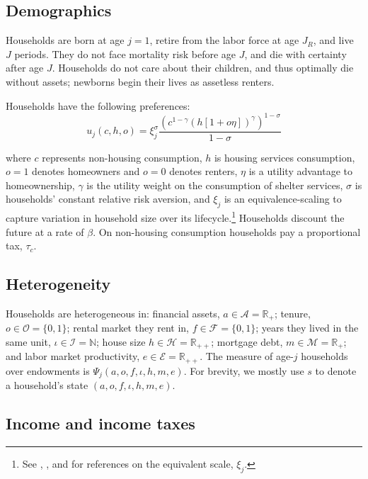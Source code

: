 \documentclass[parskip=full]{article}
\begin{document}
\subsection{Demographics}\label{subsection:demographics}

Households are born at age $j=1$, retire from the labor force at age $J_{R}$, and live $J$ periods. They do not face mortality risk before age $J$, and die with certainty after age $J$. Households do not care about their children, and thus optimally die without assets; newborns begin their lives as assetless renters.

Households have the following preferences:
\begin{equation*}
    u_{j}(c,h,o)=\xi_{j}^{\sigma}\frac{\left(c^{1-\gamma} \left(h[1+o\eta]\right)^{\gamma}\right)^{1-\sigma}}{1-\sigma}
\end{equation*}

\noindent where $c$ represents non-housing consumption, $h$ is housing services consumption, $o=1$ denotes homeowners and $o=0$ denotes renters, $\eta$ is a utility advantage to homeownership, $\gamma$ is the utility weight on the consumption of shelter services, $\sigma$ is households' constant relative risk aversion, and $\xi_{j}$ is an equivalence-scaling to capture variation in household size over its lifecycle.\footnote{See \citet{lm-1980}, \citet{wz-2010}, and \citet{xu-2013} for references on the equivalent scale, $\xi_{j}$.} Households discount the future at a rate of $\beta$. On non-housing consumption households pay a proportional tax, $\tau_{c}$.

\subsection{Heterogeneity}

Households are heterogeneous in: financial assets, $a\in \mathcal{A}=\mathbb{R}_+$; tenure, $o \in \mathcal{O}=\{0,1\}$; rental market they rent in, $f \in \mathcal{F}=\{0,1\}$; years they lived in the same unit, $\iota \in \mathcal{I}=\mathbb{N}$; house size $h\in \mathcal{H}=\mathbb{R}_{++}$; mortgage debt, $m\in \mathcal{M}=\mathbb{R}_+$; and labor market productivity, $e \in\mathcal{E} = \mathbb{R}_{++}$. The measure of age-$j$ households over endowments is $\Psi_{j}(a,o,f,\iota,h,m,e)$. For brevity, we mostly use $s$ to denote a household's state $(a,o,f,\iota,h,m,e)$.

\subsection{Income and income taxes}\label{subsection:income}
\end{document}
